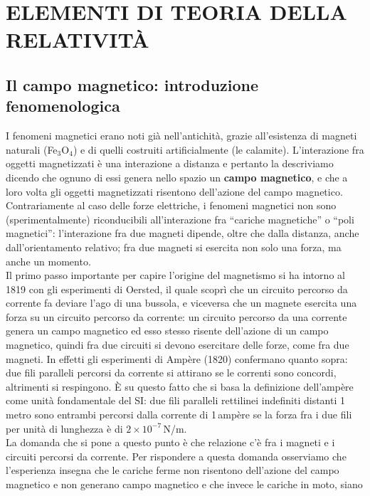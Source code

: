 \section{ELEMENTI DI TEORIA DELLA RELATIVIT\`A}

\subsection{Il campo magnetico: introduzione fenomenologica}

I fenomeni magnetici erano noti gi\`a nell'antichit\`a, grazie all'esistenza di
magneti naturali (Fe$_3$O$_4$) e di quelli costruiti artificialmente (le
calamite). L'interazione fra oggetti magnetizzati \`e una interazione a distanza
e pertanto la descriviamo dicendo che ognuno di essi genera nello spazio un
\textbf{campo magnetico}, e che a loro volta gli oggetti magnetizzati risentono
dell'azione del campo magnetico. Contrariamente al caso delle forze elettriche,
i fenomeni magnetici non sono (sperimentalmente) riconducibili all'interazione
fra ``cariche magnetiche'' o ``poli magnetici'': l'interazione fra due magneti
dipende, oltre che dalla distanza, anche dall'orientamento relativo; fra due
magneti si esercita non solo una forza, ma anche un momento.\\
Il primo passo importante per capire l'origine del magnetismo si ha intorno al
1819 con gli esperimenti di Oersted, il quale scopr\`i che un circuito percorso
da corrente fa deviare l'ago di una bussola, e viceversa che un magnete esercita
una forza su un circuito percorso da corrente: un circuito percorso da una
corrente genera un campo magnetico ed esso stesso risente dell'azione di un
campo magnetico, quindi fra due circuiti si devono esercitare delle forze, come
fra due magneti. In effetti gli esperimenti di Amp\`ere (1820) confermano quanto
sopra: due fili paralleli percorsi da corrente si attirano se le correnti sono
concordi, altrimenti si respingono. \`E su questo fatto che si basa la
definizione dell'amp\`ere come unit\`a fondamentale del SI: due fili paralleli
rettilinei indefiniti distanti 1\,metro sono entrambi percorsi dalla corrente di
1\,amp\`ere se la forza fra i due fili per unit\`a di lunghezza \`e di
$2\times10^{-7}$\,N/m.\\
La domanda che si pone a questo punto \`e che relazione c'\`e fra i magneti e i
circuiti percorsi da corrente. Per rispondere a questa domanda osserviamo che
l'esperienza insegna che le cariche ferme non risentono dell'azione del campo
magnetico e non generano campo magnetico e che invece le cariche in moto, siano
